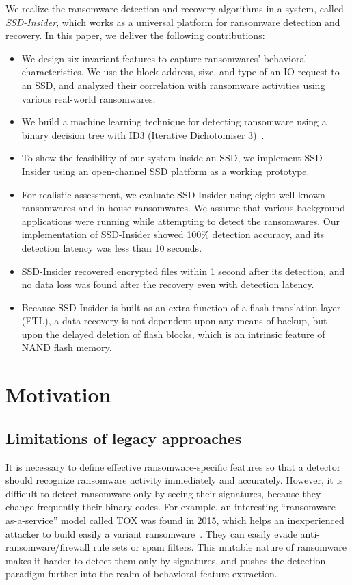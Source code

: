 \documentclass[conference]{IEEEtran}
\newcommand{\ours}{SSD-Insider}
\begin{document}
We realize the ransomware detection and recovery algorithms in a
system, called \textit{SSD-Insider}, which works as a universal
platform for ransomware detection and recovery. In this paper, we deliver the
following contributions:
\begin{itemize}
\item We design six invariant features to capture ransomwares'
behavioral characteristics. We use the block address, size, and
type of an IO request to an SSD, and analyzed their correlation
with ransomware activities using various
real-world ransomwares.
\item We build a machine learning technique for detecting ransomware using a binary decision tree
with ID3 (Iterative Dichotomiser 3)~\cite{quinlan86}.
\item To show the feasibility of our system inside an SSD, we
implement \ours{} using an open-channel SSD platform as a working
prototype.
\item For realistic assessment, we evaluate \ours{} using eight
well-known ransomwares and in-house ransomwares. We assume
that various background applications were running while attempting to detect the ransomwares.  Our
implementation of \ours{} showed 100\% detection accuracy, and its
detection latency was less than 10 seconds. 
\item \ours{} recovered encrypted files within 1 second after its
detection, and no data loss was found after the recovery even with
detection latency.
\item Because \ours{} is built as an extra function of a flash
translation layer (FTL), a data recovery is not dependent upon any
means of backup, but upon the delayed deletion of flash blocks, which is
an intrinsic feature of NAND flash memory.
\end{itemize}

\section{Motivation}

\subsection{Limitations of legacy approaches}

It is necessary to define effective ransomware-specific features so
that a detector should recognize ransomware activity immediately
and accurately.  However, it is difficult to detect ransomware only
by seeing their signatures, because they change frequently their
binary codes.  For example,  an interesting
``ransomware-as-a-service'' model called TOX was found in 2015,
which helps an inexperienced attacker to build easily a variant
ransomware~\cite{walter15}.  They can easily evade
anti-ransomware/firewall rule sets or spam filters.  This mutable
nature of ransomware makes it harder to detect them only by
signatures, and pushes the detection paradigm further into the
realm of behavioral feature extraction.
\end{document}
